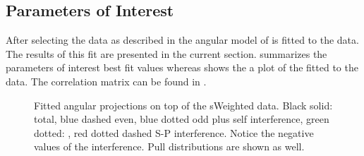 \subsection{Parameters of Interest}
\label{Parameters_of_Interest}

After selecting the data as described in  the angular model of  is fitted to the data.
The results of this fit are presented in the current section.  summarizes the parameters
of interest best fit values whereas  shows the a plot of the fitted \pdf to the \BsJpsiKst data. The correlation matrix
can be found in .


\begin{figure}[h]
\begin{center}
  \begin{subfigure}{0.5\textwidth}
    \scalebox{1.3}{}
    \caption{}
    \label{angPlot_ctk}
  \end{subfigure}%
  \hfill%
  \begin{subfigure}{0.5\textwidth}
    \scalebox{1.3}{}
    \caption{}
    \label{angPlot_ctl}
  \end{subfigure}
  \begin{subfigure}{0.5\textwidth}
    \scalebox{1.3}{}
    \caption{}
    \label{angPlot_phi}
  \end{subfigure}
  \caption{Fitted angular \pdf projections on top of the \BsJpsiKst sWeighted data.
           Black solid: total, blue dashed \pwave even, blue dotted \pwave odd plus \pwave self interference,
           green dotted: \swave, red dotted dashed S-P interference. Notice the negative values of the \spwave interference.
           Pull distributions are shown as well.}
  \label{angular_plot}
\end{center}
\end{figure}


